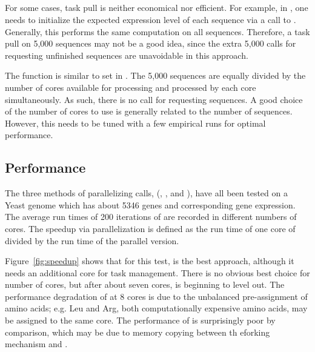 \subsection[pbdLapply()]{}
\label{sec:pbdLapply}

For some cases, task pull is neither economical nor efficient. For example, in
, one needs to initialize the expected expression level of each 
sequence via a call to . Generally, this performs the 
same computation on all sequences. Therefore, a task pull on 5,000
sequences may not be a good idea, since the extra 5,000 calls for requesting 
unfinished sequences are unavoidable in this approach.

The function  is similar to set 
in . The 5,000 sequences are equally divided by the number of 
cores available for processing and processed by each core simultaneously. 
As such, there is no call for requesting sequences. A good 
choice of the number of cores to use is generally related to the number of 
sequences. However, this needs to be tuned with a few empirical runs for 
optimal performance.


\subsection[Performance]{Performance}
\label{sec:performance}

The three methods of parallelizing  calls,  
(, , and
), have all been tested on a Yeast genome which has about 
5346 genes and corresponding gene expression. The average run times of 200 
iterations of  are recorded in different numbers of cores. 
The speedup via parallelization is defined as the run time of one core of 
 divided by the run time of the parallel version.

Figure~\ref{fig:speedup} shows that for this test,  is the 
best approach, although it needs an additional core for task management. 
There is no obvious best choice for number of cores, but after about seven 
cores,  is beginning to level out.  The 
performance degradation of  at 8 cores is due to the 
unbalanced pre-assignment of amino acids; e.g. Leu and Arg, both 
computationally expensive amino acids, may be assigned to the same core.
The performance of  is surprisingly poor by comparison, which 
may be due to memory copying between th eforking mechanism and 
. 


